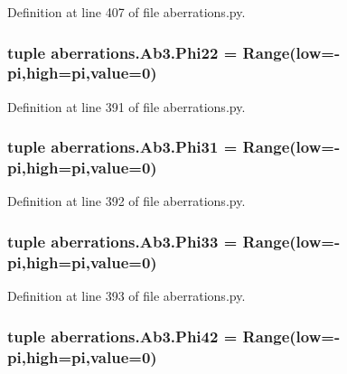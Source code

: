 Definition at line 407 of file aberrations.\-py.

\hypertarget{classaberrations_1_1_ab3_acaafddafce2b2b23f4bfb9602e0bb16f}{
\subsubsection[{Phi22}]{\setlength{\rightskip}{0pt plus 5cm}tuple aberrations.\-Ab3.\-Phi22 = Range(low=-\/pi,high=pi,{\bf value}=0)\hspace{0.3cm}{\ttfamily [static]}}}\label{classaberrations_1_1_ab3_acaafddafce2b2b23f4bfb9602e0bb16f}


Definition at line 391 of file aberrations.\-py.

\hypertarget{classaberrations_1_1_ab3_a15746a7f4fc410c4fe90d5299010fab6}{
\subsubsection[{Phi31}]{\setlength{\rightskip}{0pt plus 5cm}tuple aberrations.\-Ab3.\-Phi31 = Range(low=-\/pi,high=pi,{\bf value}=0)\hspace{0.3cm}{\ttfamily [static]}}}\label{classaberrations_1_1_ab3_a15746a7f4fc410c4fe90d5299010fab6}


Definition at line 392 of file aberrations.\-py.

\hypertarget{classaberrations_1_1_ab3_ac546f2cb70a8270bd4497883a7a40ebc}{
\subsubsection[{Phi33}]{\setlength{\rightskip}{0pt plus 5cm}tuple aberrations.\-Ab3.\-Phi33 = Range(low=-\/pi,high=pi,{\bf value}=0)\hspace{0.3cm}{\ttfamily [static]}}}\label{classaberrations_1_1_ab3_ac546f2cb70a8270bd4497883a7a40ebc}


Definition at line 393 of file aberrations.\-py.

\hypertarget{classaberrations_1_1_ab3_a15f3e797bf78f694b99cfe59cff9d29a}{
\subsubsection[{Phi42}]{\setlength{\rightskip}{0pt plus 5cm}tuple aberrations.\-Ab3.\-Phi42 = Range(low=-\/pi,high=pi,{\bf value}=0)\hspace{0.3cm}{\ttfamily [static]}}}\label{classaberrations_1_1_ab3_a15f3e797bf78f694b99cfe59cff9d29a}


